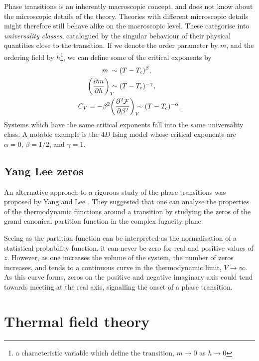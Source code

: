 Phase transitions is an inherently macroscopic concept, and does not know about
the microscopic details of the theory. Theories with different microscopic
details might therefore still behave alike on the macroscopic level. These
categorise into \emph{universality classes}, catalogued by the singular
behaviour of their physical quantities close to the transition. If we denote the
order parameter by $m$, and the ordering field by $h$\footnote{a characteristic
variable which define the transition, $m\to0$ as $h\to0$}, we can define some of
the critical exponents by
%
\begin{align}
  m \;&\sim (T - T_c)^{\beta}, \\
  \bigg(\frac{\partial m}{\partial h}\bigg)_{\mathrlap{T}} &\sim (T - T_c)^{-\gamma}, \\
  C_V = - \beta^2 &\bigg(\frac{\partial^2 \mathcal{F}}{\partial
    \beta^2}\bigg)_{\mathrlap{V}} \sim (T - T_c)^{-\alpha}.
\end{align}
%
Systems which have the same critical exponents fall into the same universality
class. A notable example is the $4D$ Ising model whose critical exponents are
$\alpha = 0$, $\beta = 1/2$, and $\gamma = 1$.

\subsection{Yang Lee zeros}

An alternative approach to a rigorous study of the phase transitions was
proposed by Yang and Lee \citep{Yang:1952be,Lee:1952ig}. They suggested that one
can analyse the properties of the thermodynamic functions around a transition by
studying the zeros of the grand canonical partition function in the complex
fugacity-plane.

Seeing as the partition function can be interpreted as the normalisation of a
statistical probability function, it can never be zero for real and positive
values of $z$. However, as one increases the volume of the system, the number of
zeros increases, and tends to a continuous curve in the thermodynamic limit,
$V\to\infty$. As this curve forms, zeros on the positive and negative imaginary
axis could tend towards meeting at the real axis, signalling the onset of a
phase transition.

\section{Thermal field theory} \label{sec-thermal-field-theory}

